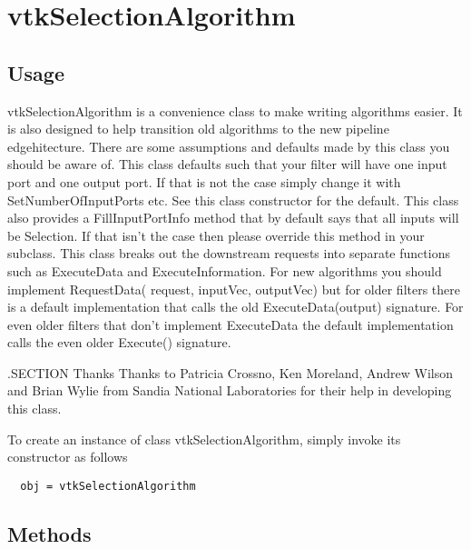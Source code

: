 \section{vtkSelectionAlgorithm}

\subsection{Usage}

 vtkSelectionAlgorithm is a convenience class to make writing algorithms
 easier. It is also designed to help transition old algorithms to the new
 pipeline edgehitecture. There are some assumptions and defaults made by this
 class you should be aware of. This class defaults such that your filter
 will have one input port and one output port. If that is not the case
 simply change it with SetNumberOfInputPorts etc. See this class
 constructor for the default. This class also provides a FillInputPortInfo
 method that by default says that all inputs will be Selection. If that
 isn't the case then please override this method in your subclass. This
 class breaks out the downstream requests into separate functions such as
 ExecuteData and ExecuteInformation.  For new algorithms you should
 implement RequestData( request, inputVec, outputVec) but for older filters
 there is a default implementation that calls the old ExecuteData(output)
 signature. For even older filters that don't implement ExecuteData the
 default implementation calls the even older Execute() signature.

 .SECTION Thanks
 Thanks to Patricia Crossno, Ken Moreland, Andrew Wilson and Brian Wylie from
 Sandia National Laboratories for their help in developing this class.

To create an instance of class vtkSelectionAlgorithm, simply
invoke its constructor as follows
\begin{verbatim}
  obj = vtkSelectionAlgorithm
\end{verbatim}
\subsection{Methods}

